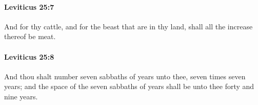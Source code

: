 		\paragraph{Leviticus 25:7} %
			\label{LEVITICUS-25-7}

			And for thy cattle, and for the beast that are in thy land, shall all the increase thereof be meat.


		\paragraph{Leviticus 25:8} %
			\label{LEVITICUS-25-8}

			And thou shalt number seven sabbaths of years unto thee, seven times seven years; and the space of the seven sabbaths of years shall be unto thee forty and nine years.


